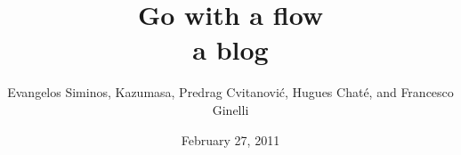\title{ 			Go with a flow
       \\ \Huge 	a blog
        \\\vspace{1.0cm}
        }\author{Evangelos Siminos,
		Kazumasa,
        Predrag Cvitanovi\'{c},
        Hugues Chat\'e, and Francesco Ginelli
        }

        \date{February 27, 2011} \Private{\date{\today}}
